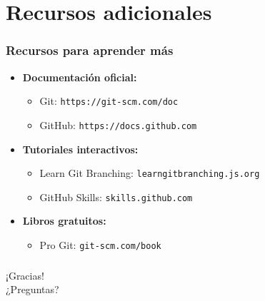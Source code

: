 \documentclass[aspectratio=169]{beamer}
\begin{document}
\section{Recursos adicionales}
\begin{frame}
\frametitle{Recursos para aprender más}
\begin{itemize}
    \item \textbf{Documentación oficial:}
    \begin{itemize}
        \item Git: \texttt{https://git-scm.com/doc}
        \item GitHub: \texttt{https://docs.github.com}
    \end{itemize}
    \item \textbf{Tutoriales interactivos:}
    \begin{itemize}
        \item Learn Git Branching: \texttt{learngitbranching.js.org}
        \item GitHub Skills: \texttt{skills.github.com}
    \end{itemize}
    \item \textbf{Libros gratuitos:}
    \begin{itemize}
        \item Pro Git: \texttt{git-scm.com/book}
    \end{itemize}
\end{itemize}
\end{frame}

\begin{frame}
\frametitle{}
\begin{center}
\Huge ¡Gracias!\\
\vspace{1cm}
\Large ¿Preguntas?
\end{center}
\end{frame}
\end{document}
